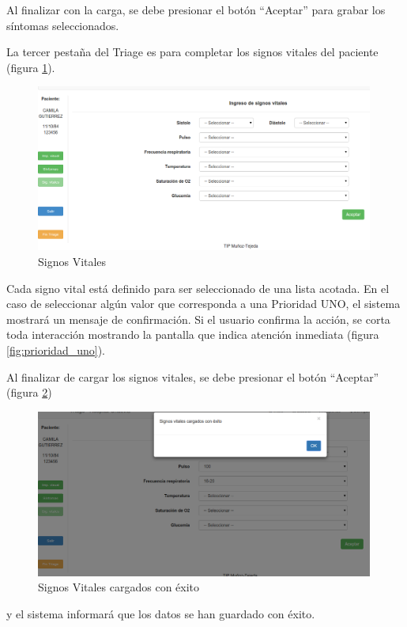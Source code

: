 Al finalizar con la carga, se debe presionar el botón ``Aceptar'' para grabar los síntomas seleccionados.


La tercer pestaña del Triage es para completar los signos vitales del paciente (figura \ref{fig:signos_vitales}).
\begin{figure}
\centerline{\includegraphics[width=0.99\textwidth]{signos_vitales.png}}
\caption{Signos Vitales} \label{fig:signos_vitales}
\end{figure}
Cada signo vital está definido para ser seleccionado de una lista acotada. En el caso de seleccionar algún valor que corresponda a una Prioridad UNO, el sistema mostrará un mensaje de confirmación. Si el usuario confirma la acción, se corta toda interacción mostrando la pantalla que indica atención inmediata (figura \ref{fig:prioridad_uno}).

Al finalizar de cargar los signos vitales, se debe presionar el botón ``Aceptar'' (figura \ref{fig:signos_vitales_guardar})
\begin{figure}
\centerline{\includegraphics[width=0.99\textwidth]{signos_vitales_guardar.png}}
\caption{Signos Vitales cargados con éxito} \label{fig:signos_vitales_guardar}
\end{figure}
y el sistema informará que los datos se han guardado con éxito.


